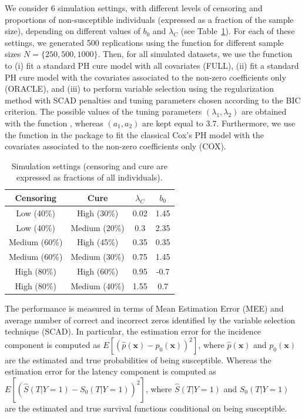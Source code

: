 We consider 6 simulation settings, with different levels of censoring and proportions of non-susceptible individuals (expressed as a fraction of the sample size), depending on different values of $b_0$ and $\lambda_C$ (see Table~\ref{table:sim_settings}).
For each of these settings, we generated 500 replications using the  function for different sample sizes $N=\{250,500,1000\}$.
Then, for all simulated datasets, we use the  function to (i) fit a standard PH cure model with all covariates (FULL), (ii) fit a standard PH cure model with the covariates associated to the non-zero coefficients only (ORACLE), and (iii) to perform variable selection using the regularization method with SCAD penalties and tuning parameters chosen according to the BIC criterion.
The possible values of the tuning parameters $(\lambda_1,\lambda_2)$ are obtained with the function , whereas $(a_1,a_2)$ are kept equal to $3.7$.
Furthermore, we use the  function in the  package \citep{survival} to fit the classical Cox's PH model with the covariates associated to the non-zero coefficients only (COX).

\begin{table}[ht]
\small
\begin{center}
\begin{tabular}{cccc}
\toprule
\textbf{Censoring} & \textbf{Cure} & $\lambda_C$ & $b_0$ \\
\midrule
Low (40\%) & High (30\%) & 0.02 & 1.45 \\
Low (40\%) & Medium (20\%) & 0.3 & 2.35 \\
Medium (60\%) & High (45\%) & 0.35 & 0.35 \\
Medium (60\%) & Medium (30\%) & 0.75 & 1.45 \\
High (80\%) & High (60\%) & 0.95 & -0.7  \\
High (80\%) & Medium (40\%) & 1.55 & 0.7 \\
\bottomrule
\end{tabular}
\end{center}
\caption{Simulation settings (censoring and cure are expressed as fractions of all individuals).}
\label{table:sim_settings}
\end{table}

The performance is measured in terms of Mean Estimation Error (MEE) and average number of correct and incorrect zeros identified by the variable selection technique (SCAD). 
In particular, the estimation error for the incidence component is computed as $E\left[ \left( \hat{p}(\mathbf{x}) - p_0(\mathbf{x}) \right)^2 \right]$, where $\hat{p}(\mathbf{x})$ and $p_0(\mathbf{x})$ are the estimated and true probabilities of being susceptible. 
Whereas the estimation error for the latency component is computed as $E\left[ \left( \hat{S}(T|Y=1)  - S_0(T|Y=1) \right)^2 \right]$, where $\hat{S}(T|Y=1)$ and $S_0(T|Y=1)$ are the estimated and true survival functions conditional on being susceptible.


